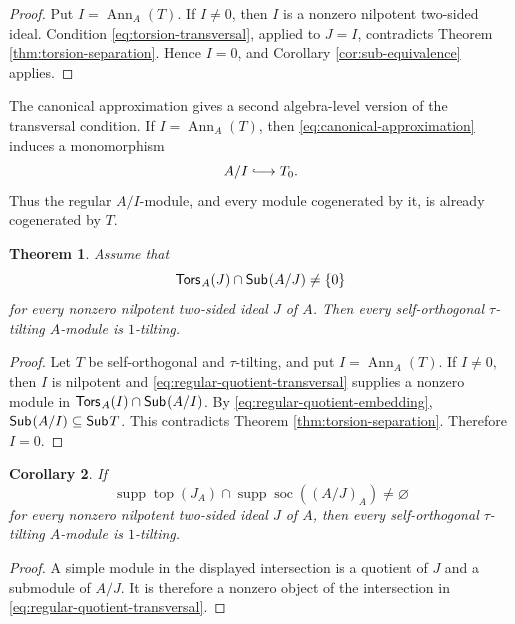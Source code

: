 \documentclass[a4paper,reqno]{amsart}
\newtheorem{theorem}{Theorem}[section]
\newtheorem{corollary}[theorem]{Corollary}
\theoremstyle{definition}
\newcommand{\Ann}{\operatorname{Ann}\nolimits}
\newcommand{\soc}{\operatorname{soc}\nolimits}
\newcommand{\topm}{\operatorname{top}\nolimits}
\newcommand{\supp}{\operatorname{supp}\nolimits}
\newcommand{\Sub}{\mathsf{Sub}\hspace{.01in}}
\newcommand{\Tors}{\mathsf{Tors}\hspace{.01in}}
\numberwithin{equation}{section}
\begin{document}
\begin{proof}
Put $I=\Ann_A(T)$. If $I\neq0$, then $I$ is a nonzero nilpotent
two-sided ideal. Condition \eqref{eq:torsion-transversal}, applied to
$J=I$, contradicts Theorem \ref{thm:torsion-separation}. Hence
$I=0$, and Corollary \ref{cor:sub-equivalence} applies.
\end{proof}

The canonical approximation gives a second algebra-level version of
the transversal condition. If $I=\Ann_A(T)$, then
\eqref{eq:canonical-approximation} induces a monomorphism
\begin{equation}\label{eq:regular-quotient-embedding}
                         A/I\lhook\joinrel\longrightarrow T_0.
\end{equation}
Thus the regular $A/I$-module, and every module cogenerated by it, is
already cogenerated by $T$.

\begin{theorem}
\label{thm:regular-quotient-transversal}
Assume that
\begin{equation}\label{eq:regular-quotient-transversal}
 \Tors_A(J)\cap\Sub(A/J)\neq\{0\}
\end{equation}
for every nonzero nilpotent two-sided ideal $J$ of $A$. Then every
self-orthogonal $\tau$-tilting $A$-module is $1$-tilting.
\end{theorem}

\begin{proof}
Let $T$ be self-orthogonal and $\tau$-tilting, and put
$I=\Ann_A(T)$. If $I\neq0$, then $I$ is nilpotent and
\eqref{eq:regular-quotient-transversal} supplies a nonzero module in
$\Tors_A(I)\cap\Sub(A/I)$. By
\eqref{eq:regular-quotient-embedding},
$\Sub(A/I)\subseteq\Sub T$. This contradicts Theorem
\ref{thm:torsion-separation}. Therefore $I=0$.
\end{proof}


\begin{corollary}
\label{cor:quotient-socle-detection}
If
\[
 \supp\topm(J_A)\cap\supp\soc((A/J)_A)\neq\varnothing
\]
for every nonzero nilpotent two-sided ideal $J$ of $A$, then every
self-orthogonal $\tau$-tilting $A$-module is $1$-tilting.
\end{corollary}

\begin{proof}
A simple module in the displayed intersection is a quotient of $J$
and a submodule of $A/J$. It is therefore a nonzero object of the
intersection in \eqref{eq:regular-quotient-transversal}.
\end{proof}
\end{document}
